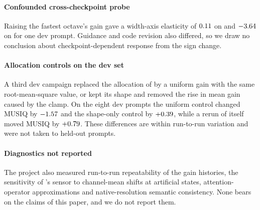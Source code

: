 \paragraph{Confounded cross-checkpoint probe}
Raising the fastest octave's gain gave a width-axis elasticity of $0.11$ on \krea{} and $-3.64$ on \fluxdev{} for one dev prompt. Guidance and code revision also differed, so we draw no conclusion about checkpoint-dependent response from the sign change.

\paragraph{Allocation controls on the dev set}
A third dev campaign replaced the allocation of \segaofficial{} by a uniform gain with the same root-mean-square value, or kept its shape and removed the rise in mean gain caused by the clamp. On the eight dev prompts the uniform control changed MUSIQ by $-1.57$ and the shape-only control by $+0.39$, while a rerun of \segaofficial{} itself moved MUSIQ by $+0.79$. These differences are within run-to-run variation and were not taken to held-out prompts.

\paragraph{Diagnostics not reported}
The project also measured run-to-run repeatability of the gain histories, the sensitivity of \sega's sensor to channel-mean shifts at artificial states, attention-operator approximations and native-resolution semantic consistency. None bears on the claims of this paper, and we do not report them.


